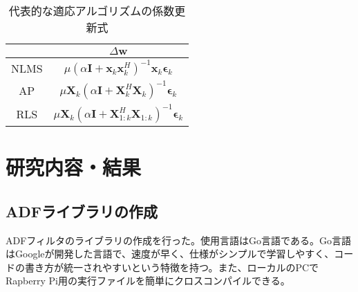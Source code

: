 \documentclass[a4paper, twocolumn]{ltjsarticle}
\begin{document}
  \begin{table}[h]
    \centering
    \caption{代表的な適応アルゴリズムの係数更新式}
    \label{tab:formula}
    \begin{tabular}{|c|c|}
    \hline
    & \(\Delta \symbf{w}\)                                                                                             \\ \hline
    NLMS        & \( \mu \left( \alpha \symbf{I} + \symbf{x}_k \symbf{x}_k^H \right)^{-1} \symbf{x}_k \symbf{\epsilon}_k \)        \\ \hline
    AP          & \(\mu \symbf{X}_k \left( \alpha \symbf{I} + \symbf{X}_k^H \symbf{X}_k \right)^{-1} \symbf{\epsilon}_k\)          \\ \hline
    RLS         & \( \mu \symbf{X}_k \left( \alpha \symbf{I} + \symbf{X}_{1:k}^H \symbf{X}_{1:k} \right)^{-1} \symbf{\epsilon}_k\) \\ \hline
    \end{tabular}
  \end{table}



\section{研究内容・結果}
  \subsection{ADFライブラリの作成}
    ADFフィルタのライブラリの作成を行った。使用言語はGo言語である。Go言語はGoogleが開発した言語で、速度が早く、仕様がシンプルで学習しやすく、コードの書き方が統一されやすいという特徴を持つ。また、ローカルのPCでRapberry Pi用の実行ファイルを簡単にクロスコンパイルできる。
\end{document}
